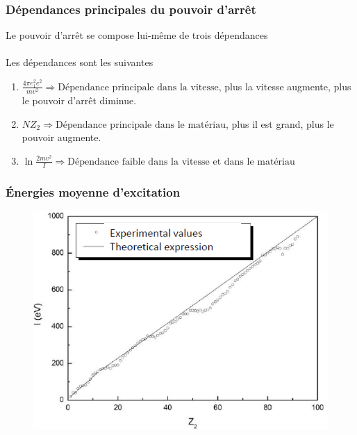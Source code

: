 \subsubsection{Dépendances principales du pouvoir d'arrêt}
Le pouvoir d'arrêt se compose lui-même de trois dépendances\ \\

\ \\

Les dépendances sont les suivantes
\begin{enumerate}
\item $\frac{4\pi e_1^2e^2}{mv^2}\Rightarrow{\mbox{D\'ependance principale dans la vitesse}}$, plus la vitesse augmente, plus le pouvoir d'arrêt diminue.
\item $NZ_2\Rightarrow{\mbox{D\'ependance principale dans le mat\'eriau}}$, plus il est grand, plus le pouvoir augmente.
\item $\ln{\frac{2mv^2}{I}}\Rightarrow{\mbox{D\'ependance faible dans la vitesse et dans le mat\'eriau}}$
\end{enumerate}

	\subsubsection{Énergies moyenne d'excitation}
	\begin{figure}
	\vspace{-5mm}
	\includegraphics[scale=0.5]{ch2/image2.png}
	\end{figure}
	

